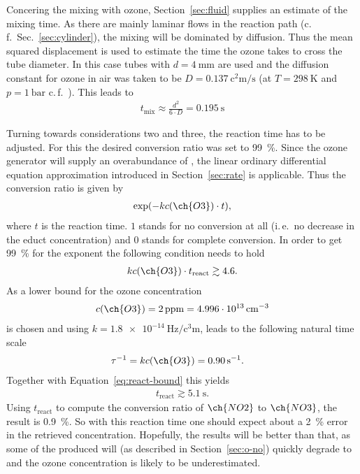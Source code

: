 Concering the mixing with ozone, Section~\ref{sec:fluid} supplies an
estimate of the mixing time. As there are mainly laminar flows in the
reaction path (c.\,f.\ Sec.~\ref{sec:cylinder}), the mixing will be
dominated by diffusion. Thus the mean squared displacement is used to
estimate the time the ozone takes to cross the tube diameter. In this
case tubes with $d = \SI{4}{\milli\meter}$ are used and the diffusion
constant for ozone in air was taken to be
$D = \SI{0.137}{\square\centi\meter\per\second}$ (at
$T = \SI{298}{\kelvin}$ and $p = \SI{1}{\text{bar}}$
c.\,f.~\cite{diff-ozone}). This leads to
\begin{align*}
  t_{\text{mix}} \approx \frac{d^2}{6\cdot D} = \SI{0.195}{\second}
\end{align*}

Turning towards considerations two and three, the reaction time has to
be adjusted. For this the desired conversion ratio was set to
\SI{99}{\%}. Since the ozone generator will supply an overabundance of
, the linear ordinary differential equation approximation
introduced in Section~\ref{sec:rate} is applicable. Thus the
conversion ratio is given by
\begin{align*}
  \exp(-kc(\ch{O3})\cdot t),
\end{align*}
where $t$ is the reaction time. $1$ stands for no
conversion at all (i.\,e.\ no decrease in the educt concentration) and
$0$ stands for complete conversion. In order to get \SI{99}{\%} for
the exponent the following condition needs to hold
\begin{align}
  kc(\ch{O3}) \cdot t_{\text{react}} \gtrsim 4.6. \label{eq:react-bound}
\end{align}
As a lower bound for the ozone concentration 
\begin{align*}
  c(\ch{O3}) = \SI{2}{ppm} = \SI{4.996e13}{\per\cubic\centi\meter} 
\end{align*}
is chosen and using $k = \SI{1.8e-14}{\hertz\per\cubic\centi\meter}$,
leads to the following natural time scale
\begin{align*}
  \tau^{-1} & = k c(\ch{O3}) = \SI{0.90}{\per\second}.
\end{align*}
Together with Equation~\eqref{eq:react-bound} this yields
\begin{align*}
  t_{\text{react}} \gtrsim \SI{5.1}{\second}.
\end{align*}
Using $t_{\text{react}}$ to compute the conversion ratio of $\ch{NO2}$
to $\ch{NO3}$, the result is \SI{0.9}{\%}. So with this reaction time
one should expect about a \SI{2}{\%} error in the retrieved 
concentration. Hopefully, the results will be better than that, as
some of the produced  will (as described in
Section~\ref{sec:o-no}) quickly degrade to  and the ozone
concentration is likely to be underestimated.

